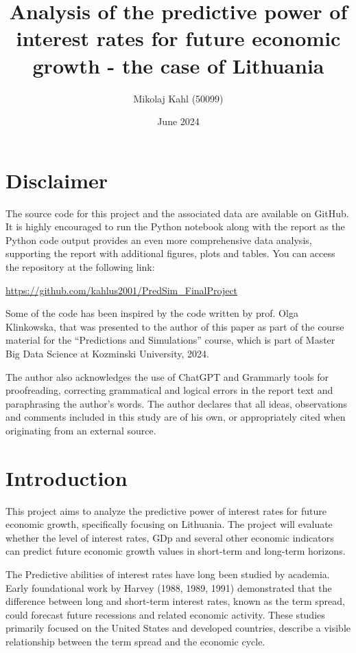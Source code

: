\documentclass[12pt]{article}
\title{Analysis of the predictive power of interest rates for future economic growth - the case of Lithuania}
\author{Mikolaj Kahl (50099) }
\date{June 2024}
\begin{document}
\maketitle
\newpage

\section*{Disclaimer}

The source code for this project and the associated data are available on GitHub. It is highly encouraged to run the Python notebook along with the report as the Python code output provides an even more comprehensive data analysis, supporting the report with additional figures, plots and tables. You can access the repository at the following link:

\url{https://github.com/kahlus2001/PredSim_FinalProject}

Some of the code has been inspired by the code written by prof. Olga Klinkowska, that was presented to the author of this paper as part of the course material for the ``Predictions and Simulations'' course, which is part of Master Big Data Science at Kozminski University, 2024.

The author also acknowledges the use of ChatGPT and Grammarly tools for proofreading, correcting grammatical and logical errors in the report text and paraphrasing the author's words. The author declares that all ideas, observations and comments included in this study are of his own, or appropriately cited when originating from an external source.

\newpage

\section{Introduction}

This project aims to analyze the predictive power of interest rates for future economic growth, specifically focusing on Lithuania. The project will evaluate whether the level of interest rates, GDp and several other economic indicators can predict future economic growth values in short-term and long-term horizons. 

The Predictive abilities of interest rates have long been studied by academia. Early foundational work by Harvey (1988, 1989, 1991) demonstrated that the difference between long and short-term interest rates, known as the term spread, could forecast future recessions and related economic activity. These studies primarily focused on the United States and developed countries, describe a visible relationship between the term spread and the economic cycle.
\end{document}
